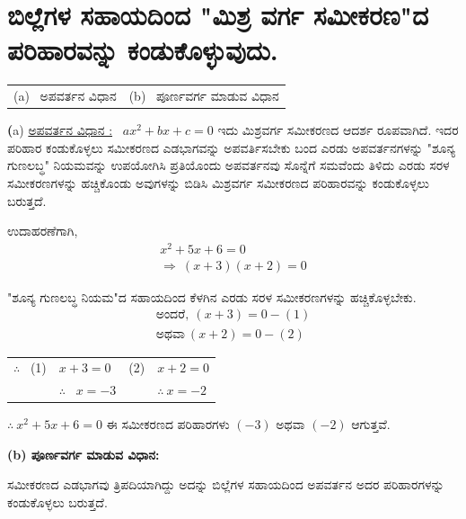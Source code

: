 \section*{ಬಿಲ್ಲೆಗಳ ಸಹಾಯದಿಂದ "ಮಿಶ್ರ ವರ್ಗ ಸಮೀಕರಣ"ದ ಪರಿಹಾರವನ್ನು ಕಂಡು\break ಕೊಳ್ಳುವುದು.}

\noindent
\begin{tabular}{@{}ll}
(a)~  ಅಪವರ್ತನ ವಿಧಾನ & (b)~ ಪೂರ್ಣವರ್ಗ ಮಾಡುವ ವಿಧಾನ
\end{tabular}

\smallskip
\noindent
{\textbf(a) {\underline{ಅಪವರ್ತನ ವಿಧಾನ :}}}~ $ax^2 + bx + c = 0$ ಇದು ಮಿಶ್ರವರ್ಗ ಸಮೀಕರಣದ ಆದರ್ಶ ರೂಪವಾಗಿದೆ. ಇದರ ಪರಿಹಾರ ಕಂಡುಕೊಳ್ಳಲು ಸಮೀಕರಣದ ಎಡಭಾಗವನ್ನು ಅಪವರ್ತಿಸಬೇಕು ಬಂದ ಎರಡು ಅಪವರ್ತನಗಳನ್ನು "ಶೂನ್ಯ ಗುಣಲಬ್ಧ" ನಿಯಮವನ್ನು ಉಪಯೋಗಿಸಿ ಪ್ರತಿಯೊಂದು ಅಪವರ್ತನವು ಸೊನ್ನೆಗೆ ಸಮವೆಂದು ತಿಳಿದು ಎರಡು ಸರಳ ಸಮೀಕರಣಗಳನ್ನು ಹಚ್ಚಿಕೊಂಡು ಅವುಗಳನ್ನು ಬಿಡಿಸಿ ಮಿಶ್ರವರ್ಗ ಸಮೀಕರಣದ ಪರಿಹಾರವನ್ನು ಕಂಡುಕೊಳ್ಳಲು ಬರುತ್ತದೆ. 

ಉದಾಹರಣೆಗಾಗಿ, 
\begin{gather*}
x^2 + 5x + 6 = 0\\
\Rightarrow~ (x+3)(x+2) = 0
\end{gather*}

"ಶೂನ್ಯ ಗುಣಲಬ್ಧ ನಿಯಮ"ದ ಸಹಾಯದಿಂದ ಕೆಳಗಿನ ಎರಡು ಸರಳ ಸಮೀಕರಣಗಳನ್ನು ಹಚ್ಚಿಕೊಳ್ಳಬೇಕು.
\begin{gather*}
\text{ಅಂದರೆ},~ (x+3) = 0 -(1) \\
\text{ಅಥವಾ}~ (x+2) = 0 -(2) 
\end{gather*}

\begin{tabular}{llll}
$\therefore$~ (1) & $x + 3 = 0$ & (2) & $x+2 = 0$\\
& $\therefore$~ $x = -3$ & &$\therefore~ x = -2$
\end{tabular}

$\therefore~ x^2 + 5x + 6 = 0$ ಈ ಸಮೀಕರಣದ ಪರಿಹಾರಗಳು $(-3)$ ಅಥವಾ $(-2)$ ಆಗುತ್ತವೆ.

\noindent 
\textbf{(b) ಪೂರ್ಣವರ್ಗ ಮಾಡುವ ವಿಧಾನ:}

ಸಮೀಕರಣದ ಎಡಭಾಗವು ತ್ರಿಪದಿಯಾಗಿದ್ದು ಅದನ್ನು ಬಿಲ್ಲೆಗಳ ಸಹಾಯದಿಂದ ಅಪ\-ವರ್ತನ ಅದರ ಪರಿಹಾರಗಳನ್ನು ಕಂಡುಕೊಳ್ಳಲು ಬರುತ್ತದೆ. 

